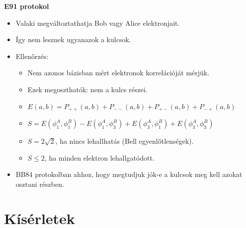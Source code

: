 \documentclass{beamer}
\begin{document}
    \begin{frame}

        \center

        \textbf{E91 protokol}

        \begin{itemize}
            \item Valaki megváltoztathatja Bob vagy Alice elektronjait.
            \item Így nem lesznek ugyanazok a kulcsok.
            \item Ellenőrzés:
                \begin{itemize}
                    \item Nem azonos bázisban mért elektronok korrelációját mérjük.
                    \item Ezek megoszthatók: nem a kulcs részei.
                    \item $E(a,b) = P_{++}(a,b) + P_{--}(a,b) + P_{+-}(a,b) + P_{-+}(a,b)$
                    \item $S = E(\phi^A_1, \phi^B_1)
                        - E(\phi^A_1, \phi^B_3)
                        + E(\phi^A_3, \phi^B_1)
                        + E(\phi^A_3, \phi^B_3)$
                    \item $S = 2 \sqrt{2}$, ha nincs lehallhatás (Bell egyenlőtlenségek).
                    \item $S \leq 2$, ha minden elektron lehallgatódott.
                \end{itemize}
            \item BB84 protokolban ahhoz, hogy megtudjuk jók-e a kulcsok meg kell azokat osztani részben.
        \end{itemize}

    \end{frame}

    \section{Kísérletek}
\end{document}
